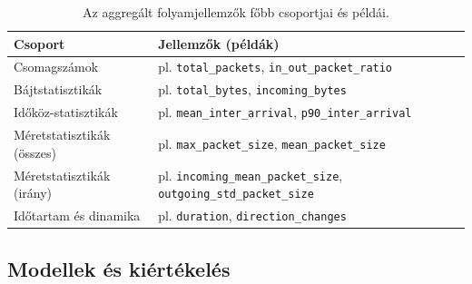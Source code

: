 \documentclass[a4paper,oneside]{article}
\begin{document}
\begin{table}[tbp]
    \caption{Az aggregált folyamjellemzők főbb csoportjai és példái.}
    \vspace{2mm}
    \centering
    \begin{tabular}{p{4.5cm} p{10cm}}
        \toprule
        \textbf{Csoport} & \textbf{Jellemzők (példák)} \\ \midrule
        Csomagszámok & pl.
\texttt{total\_packets}, \texttt{in\_out\_packet\_ratio} \\
        Bájtstatisztikák & pl.
\texttt{total\_bytes}, \texttt{incoming\_bytes} \\
        Időköz-statisztikák & pl.
\texttt{mean\_inter\_arrival}, \texttt{p90\_inter\_arrival} \\
        Méretstatisztikák (összes) & pl.
\texttt{max\_packet\_size}, \texttt{mean\_packet\_size} \\
        Méretstatisztikák (irány) & pl.
\texttt{incoming\_mean\_packet\_size}, \texttt{outgoing\_std\_packet\_size} \\
        Időtartam és dinamika & pl.
\texttt{duration}, \texttt{direction\_changes} \\
        \bottomrule
    \end{tabular}
    \label{tab:feature_groups}
\end{table}

\subsection{Modellek és kiértékelés}
\end{document}
